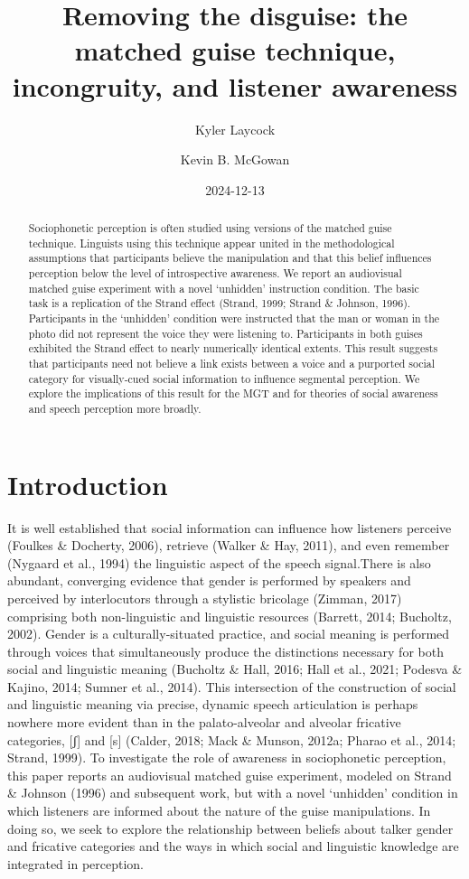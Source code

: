 \documentclass[
  letterpaper,
  DIV=11,
  numbers=noendperiod]{scrartcl}
\title{Removing the disguise: the matched guise technique, incongruity,
and listener awareness}
\author{Kyler Laycock \and Kevin B. McGowan}
\date{2024-12-13}
\begin{document}
\maketitle
\begin{abstract}
Sociophonetic perception is often studied using versions of the matched
guise technique. Linguists using this technique appear united in the
methodological assumptions that participants believe the manipulation
and that this belief influences perception below the level of
introspective awareness. We report an audiovisual matched guise
experiment with a novel `unhidden' instruction condition. The basic task
is a replication of the Strand effect (Strand, 1999; Strand \& Johnson,
1996). Participants in the `unhidden' condition were instructed that the
man or woman in the photo did not represent the voice they were
listening to. Participants in both guises exhibited the Strand effect to
nearly numerically identical extents. This result suggests that
participants need not believe a link exists between a voice and a
purported social category for visually-cued social information to
influence segmental perception. We explore the implications of this
result for the MGT and for theories of social awareness and speech
perception more broadly.
\end{abstract}


\section{Introduction}\label{sec-intro}

It is well established that social information can influence how
listeners perceive (Foulkes \& Docherty, 2006), retrieve (Walker \& Hay,
2011), and even remember (Nygaard et al., 1994) the linguistic aspect of
the speech signal.There is also abundant, converging evidence that
gender is performed by speakers and perceived by interlocutors through a
stylistic bricolage (Zimman, 2017) comprising both non-linguistic and
linguistic resources (Barrett, 2014; Bucholtz, 2002). Gender is a
culturally-situated practice, and social meaning is performed through
voices that simultaneously produce the distinctions necessary for both
social and linguistic meaning (Bucholtz \& Hall, 2016; Hall et al.,
2021; Podesva \& Kajino, 2014; Sumner et al., 2014). This intersection
of the construction of social and linguistic meaning via precise,
dynamic speech articulation is perhaps nowhere more evident than in the
palato-alveolar and alveolar fricative categories, {[}ʃ{]} and {[}s{]}
(Calder, 2018; Mack \& Munson, 2012a; Pharao et al., 2014; Strand,
1999). To investigate the role of awareness in sociophonetic perception,
this paper reports an audiovisual matched guise experiment, modeled on
Strand \& Johnson (1996) and subsequent work, but with a novel
`unhidden' condition in which listeners are informed about the nature of
the guise manipulations. In doing so, we seek to explore the
relationship between beliefs about talker gender and fricative
categories and the ways in which social and linguistic knowledge are
integrated in perception.
\end{document}
